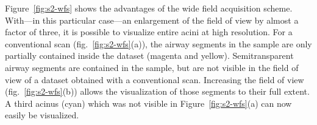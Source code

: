 Figure~\ref{fig:s2-wfs} shows the advantages of the wide field acquisition scheme. With---in this particular case---an enlargement of the field of view by almost a factor of three, it is possible to visualize entire acini at high resolution. For a conventional scan (fig.~\ref{fig:s2-wfs}(a)), the airway segments in the sample are only partially contained inside the dataset (magenta and yellow). Semitransparent airway segments are contained in the sample, but are not visible in the field of view of a dataset obtained with a conventional scan. Increasing the field of view (fig.~\ref{fig:s2-wfs}(b)) allows the visualization of those segments to their full extent. A third acinus (cyan) which was not visible in Figure~\ref{fig:s2-wfs}(a) can now easily be visualized.

\renewcommand{\imsize}{.618\linewidth}%
